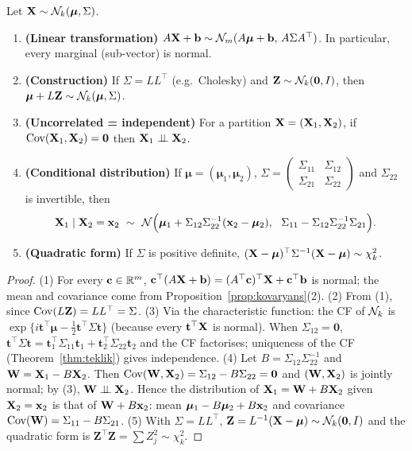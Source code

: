 \documentclass[main.tex]{subfiles}
\begin{document}
\begin{theorem}\label{thm:mvn}
Let $\mathbf{X}\sim\mathcal{N}_k(\bm\mu,\Sigma)$.
\begin{enumerate}
  \item \textbf{(Linear transformation)} $A\mathbf{X}+\mathbf b\sim\mathcal{N}_m(A\bm\mu+\mathbf b,\,A\Sigma A^\top)$. In particular, every marginal (sub-vector) is normal.
  \item \textbf{(Construction)} If $\Sigma=LL^\top$ (e.g.\ Cholesky) and $\mathbf Z\sim\mathcal{N}_k(\mathbf 0,I)$, then $\bm\mu+L\mathbf Z\sim\mathcal{N}_k(\bm\mu,\Sigma)$.
  \item \textbf{(Uncorrelated = independent)} For a partition $\mathbf{X}=(\mathbf{X}_1,\mathbf{X}_2)$, if $\operatorname{Cov}(\mathbf{X}_1,\mathbf{X}_2)=\mathbf 0$ then $\mathbf{X}_1\perp\!\!\!\perp\mathbf{X}_2$.
  \item \textbf{(Conditional distribution)} If $\bm\mu=(\bm\mu_1,\bm\mu_2)$, $\Sigma=\begin{pmatrix}\Sigma_{11}&\Sigma_{12}\\\Sigma_{21}&\Sigma_{22}\end{pmatrix}$ and $\Sigma_{22}$ is invertible, then
  \[
  \X_1\mid\X_2=\x_2\ \sim\ \Normal\Big(\bm\mu_1+\Sigma_{12}\Sigma_{22}^{-1}(\x_2-\bm\mu_2),\ \ \Sigma_{11}-\Sigma_{12}\Sigma_{22}^{-1}\Sigma_{21}\Big).
  \]
  \item \textbf{(Quadratic form)} If $\Sigma$ is positive definite, $(\mathbf{X}-\bm\mu)^\top\Sigma^{-1}(\mathbf{X}-\bm\mu)\sim\chi^2_k$.
\end{enumerate}
\end{theorem}
\begin{proof}
(1) For every $\mathbf c\in\mathbb{R}^m$, $\mathbf c^\top(A\mathbf{X}+\mathbf b)=(A^\top\mathbf c)^\top\mathbf{X}+\mathbf c^\top\mathbf b$ is normal; the mean and covariance come from Proposition~\ref{prop:kovaryans}(2).
(2) From (1), since $\operatorname{Cov}(L\mathbf Z)=LL^\top=\Sigma$.
(3) Via the characteristic function: the CF of $\mathcal{N}_k$ is $\exp\{i\mathbf t^\top\bm\mu-\frac12\mathbf t^\top\Sigma\mathbf t\}$ (because every $\mathbf t^\top\mathbf{X}$ is normal). When $\Sigma_{12}=\mathbf 0$, $\mathbf t^\top\Sigma\mathbf t=\mathbf t_1^\top\Sigma_{11}\mathbf t_1+\mathbf t_2^\top\Sigma_{22}\mathbf t_2$ and the CF factorises; uniqueness of the CF (Theorem~\ref{thm:teklik}) gives independence.
(4) Let $B=\Sigma_{12}\Sigma_{22}^{-1}$ and $\mathbf W=\mathbf{X}_1-B\mathbf{X}_2$. Then $\operatorname{Cov}(\mathbf W,\mathbf{X}_2)=\Sigma_{12}-B\Sigma_{22}=\mathbf 0$ and $(\mathbf W,\mathbf{X}_2)$ is jointly normal; by (3), $\mathbf W\perp\!\!\!\perp\mathbf{X}_2$. Hence the distribution of $\mathbf{X}_1=\mathbf W+B\mathbf{X}_2$ given $\mathbf{X}_2=\mathbf{x}_2$ is that of $\mathbf W+B\mathbf{x}_2$: mean $\bm\mu_1-B\bm\mu_2+B\mathbf{x}_2$ and covariance $\operatorname{Cov}(\mathbf W)=\Sigma_{11}-B\Sigma_{21}$.
(5) With $\Sigma=LL^\top$, $\mathbf Z=L^{-1}(\mathbf{X}-\bm\mu)\sim\mathcal{N}_k(\mathbf 0,I)$ and the quadratic form is $\mathbf Z^\top\mathbf Z=\sum Z_j^2\sim\chi^2_k$.
\end{proof}
\end{document}
